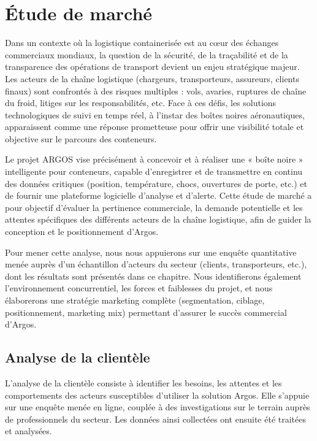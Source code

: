 \chapter{Étude de marché}
	\indent Dans un contexte où la logistique containerisée est au cœur des échanges commerciaux mondiaux, la question de la sécurité, de la traçabilité et de la transparence des opérations de transport devient un enjeu stratégique majeur. Les acteurs de la chaîne logistique (chargeurs, transporteurs, assureurs, clients finaux) sont confrontés à des risques multiples : vols, avaries, ruptures de chaîne du froid, litiges sur les responsabilités, etc. Face à ces défis, les solutions technologiques de suivi en temps réel, à l’instar des boîtes noires aéronautiques, apparaissent comme une réponse prometteuse pour offrir une visibilité totale et objective sur le parcours des conteneurs.

Le projet ARGOS vise précisément à concevoir et à réaliser une « boîte noire » intelligente pour conteneurs, capable d’enregistrer et de transmettre en continu des données critiques (position, température, chocs, ouvertures de porte, etc.) et de fournir une plateforme logicielle d’analyse et d’alerte. Cette étude de marché a pour objectif d’évaluer la pertinence commerciale, la demande potentielle et les attentes spécifiques des différents acteurs de la chaîne logistique, afin de guider la conception et le positionnement d’Argos.

Pour mener cette analyse, nous nous appuierons sur une enquête quantitative menée auprès d’un échantillon d’acteurs du secteur (clients, transporteurs, etc.), dont les résultats sont présentés dans ce chapitre. Nous identifierons également l’environnement concurrentiel, les forces et faiblesses du projet, et nous élaborerons une stratégie marketing complète (segmentation, ciblage, positionnement, marketing mix) permettant d’assurer le succès commercial d’Argos.

\section{Analyse de la clientèle}

\indent L’analyse de la clientèle consiste à identifier les besoins, les attentes et les comportements des acteurs susceptibles d’utiliser la solution Argos. Elle s'appuie sur une enquête menée en ligne, couplée à des investigations sur le terrain auprès de professionnels du secteur. Les données ainsi collectées ont ensuite été traitées et analysées.
